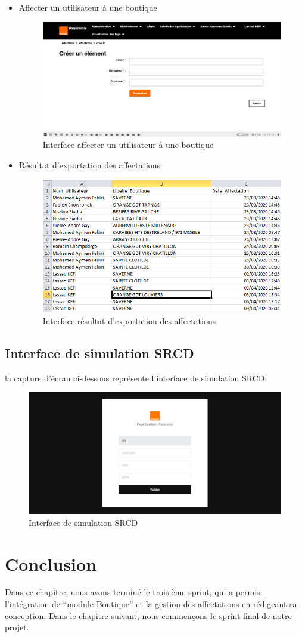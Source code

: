 \begin{itemize}
	\item Affecter un utilisateur à une boutique
	\begin{figure}[H]
		\centering
		\includegraphics[width=0.6\linewidth]{"img/screenshots/affectation users-boutique/affectation"}
		\caption[Interface affecter un utilisateur à une boutique]{Interface affecter un utilisateur à une boutique}
		\label{fig:create-affectation}
	\end{figure}
	\newpage
	\item Résultat d'exportation des affectations
	\begin{figure}[H]
		\centering
		\includegraphics[width=0.7\linewidth]{"img/screenshots/affectation users-boutique/export"}
		\caption[Interface résultat d'exportation des affectations]{Interface résultat d'exportation des affectations}
		\label{fig:export-affectation}
	\end{figure}
\end{itemize}
\subsection{Interface de simulation SRCD}
la capture d'écran ci-dessous représente l’interface de simulation SRCD.
\begin{figure}[H]
	\centering
	\includegraphics[width=0.7\linewidth]{"img/screenshots/logs + srcd/screencapture-localhost-pano-pfe-panoramix-public-srcd-phtml-2020-06-11-18_18_04"}
	\caption[Interface de simulation SRCD]{Interface de simulation SRCD}
	\label{fig:srcd}
\end{figure}

\section*{Conclusion}
Dans ce chapitre, nous avons terminé le troisième sprint, qui a permis l'intégration de “module Boutique” et la gestion des affectations en rédigeant sa conception. Dans le chapitre suivant, nous commençons le sprint final de notre projet.
